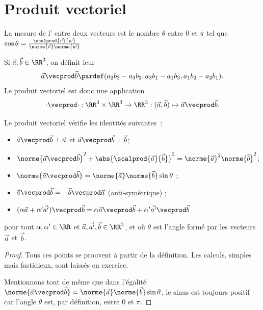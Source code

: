 \section{Produit vectoriel}
\begin{frame}
  \begin{definition}
    La mesure de l' entre deux vecteurs est le nombre \(\theta\) entre \(0\) et \(\pi\) tel que
    \(\cos \theta = \frac{\scalprod{\vec{v}}{\vec{w}}}{\norme{\vec{v}}\norme{\vec{w}}}\)
  \end{definition}
\end{frame}
\begin{frame}
  \label{sec:produit-vectoriel}
  \begin{definition}Si \(\vec a, \vec b \in \RR^{3}\), on définit leur 
    \begin{equation*}
      \vec a \vecprod \vec b \pardef (a_{2} b_{3} - a_{3} b_{2}, a_{3} b_{1} - a_{1} b_{3}, a_{1} b_{2} - a_{2} b_{1}).
    \end{equation*}\pause
    Le produit vectoriel est donc une application
    \begin{equation*}
      \cdot\vecprod\cdot : \RR^{3} \times \RR^{3} \to \RR^{3} : (\vec a, \vec b) \mapsto \vec a \vecprod \vec b.
    \end{equation*}
  \end{definition}
\end{frame}
\begin{frame}
\begin{proposition}Le produit vectoriel vérifie les identités suivantes~:
    \begin{itemize}[<+->]
    \item \(\vec a \vecprod \vec b \perp \vec a\) et \(\vec a \vecprod \vec b \perp \vec b\);
    \item \(\norme{\vec a \vecprod \vec b}^{2} + \abs{\scalprod{\vec a }{\vec b}}^{2} = \norme {\vec a}^{2} \norme{\vec b}^{2}\);
    \item \(\norme{\vec a \vecprod \vec b} = \norme {\vec a} \norme{\vec b} \sin \theta \) ;
    \item \(\vec a \vecprod \vec b = -\vec b \vecprod \vec a\) (anti-symétrique) ;
    \item \((\alpha \vec {a} + \alpha' \vec{a'}) \vecprod \vec b = \alpha {\vec a \vecprod \vec b} + \alpha' {\vec {a'} \vecprod \vec b}\)
    \end{itemize}
    pour tout \(\alpha, \alpha' \in \RR\) et \(\vec a, \vec {a'}, \vec b \in \RR^{3}\), et où \(\theta\) est l'angle formé par les vecteurs \(\vec a\) et \(\vec b\).
  \end{proposition}\pause
  \begin{proof}
    Tous ces points se prouvent à partir de la définition. Les calculs, simples mais fastidieux, sont laissés en exercice.

    Mentionnons tout de même que dans l'égalité \(\norme{\vec a \vecprod \vec b} = \norme {\vec a} \norme{\vec b} \sin \theta\), le sinus est toujours positif car l'angle \(\theta\) est, par définition, entre \(0\) et \(\pi\).
  \end{proof}
\end{frame}
